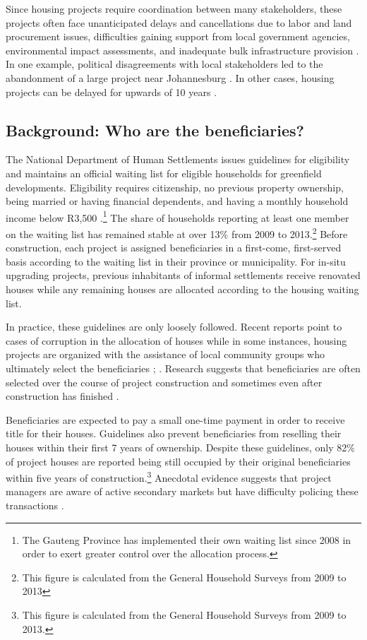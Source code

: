 \documentclass[12pt]{article}
\begin{document}
Since housing projects require coordination between many stakeholders, these projects often face unanticipated delays and cancellations due to labor and land procurement issues, difficulties gaining support from local government agencies, environmental impact assessments, and inadequate bulk infrastructure provision \citep{dhsreports}.  In one example, political disagreements with local stakeholders led to the abandonment of a large project near Johannesburg \citep{protest}.  In other cases, housing projects can be delayed for upwards of 10 years \citep{dagpl}. 


\subsection{Background: Who are the beneficiaries?}

The National Department of Human Settlements issues guidelines for eligibility and maintains an official waiting list for eligible households for greenfield developments.  Eligibility requires citizenship, no previous property ownership, being married or having financial dependents, and having a monthly household income below R3,500 \citep{seriq}.\footnote{The Gauteng Province has implemented their own waiting list since 2008 in order to exert greater control over the allocation process.}  The share of households reporting at least one member on the waiting list has remained stable at over 13\% from 2009 to 2013.\footnote{This figure is calculated from the General Household Surveys from 2009 to 2013}  Before construction, each project is assigned beneficiaries in a first-come, first-served basis according to the waiting list in their province or municipality.  For in-situ upgrading projects, previous inhabitants of informal settlements receive renovated houses while any remaining houses are allocated according to the housing waiting list.

In practice, these guidelines are only loosely followed.  Recent reports point to cases of corruption in the allocation of houses while in some instances, housing projects are organized with the assistance of local community groups who ultimately select the beneficiaries \citep{seriq}; \citep{casestudytinazonke}.  Research suggests that beneficiaries are often selected over the course of project construction and sometimes even after construction has finished \citep{seriq}.

Beneficiaries are expected to pay a small one-time payment in order to receive title for their houses.  Guidelines also prevent beneficiaries from reselling their houses within their first 7 years of ownership.  Despite these guidelines, only 82\% of project houses are reported being still occupied by their original beneficiaries within five years of construction.\footnote{This figure is calculated from the General Household Surveys from 2009 to 2013.}  Anecdotal evidence suggests that project managers are aware of active secondary markets but have difficulty policing these transactions \citep{resale}.
\end{document}
